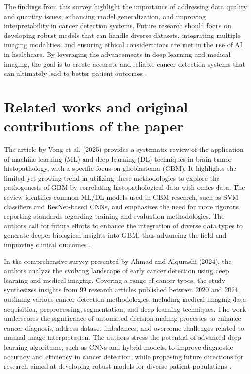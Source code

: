 \documentclass[runningheads]{llncs}
\begin{document}
The findings from this survey highlight the importance of addressing data quality and quantity issues, enhancing model generalization, and improving interpretability in cancer detection systems. Future research should focus on developing robust models that can handle diverse datasets, integrating multiple imaging modalities, and ensuring ethical considerations are met in the use of AI in healthcare. By leveraging the advancements in deep learning and medical imaging, the goal is to create accurate and reliable cancer detection systems that can ultimately lead to better patient outcomes \cite{Istiak_2024}.
\section{Related works and original contributions of the paper}
The article by Vong et al. (2025) provides a systematic review of the application of machine learning (ML) and deep learning (DL) techniques in brain tumor histopathology, with a specific focus on glioblastoma (GBM). It highlights the limited yet growing trend in utilizing these methodologies to explore the pathogenesis of GBM by correlating histopathological data with omics data. The review identifies common ML/DL models used in GBM research, such as SVM classifiers and ResNet-based CNNs, and emphasizes the need for more rigorous reporting standards regarding training and evaluation methodologies. The authors call for future efforts to enhance the integration of diverse data types to generate deeper biological insights into GBM, thus advancing the field and improving clinical outcomes \cite{Chun_2025}.

In the comprehensive survey presented by Ahmad and Alqurashi (2024), the authors analyze the evolving landscape of early cancer detection using deep learning and medical imaging. Covering a range of cancer types, the study synthesizes insights from 99 research articles published between 2020 and 2024, outlining various cancer detection methodologies, including medical imaging data acquisition, preprocessing, segmentation, and deep learning techniques. The work underscores the significance of automated decision-making processes to enhance cancer diagnosis, address dataset imbalances, and overcome challenges related to manual image interpretation. The authors stress the potential of advanced deep learning algorithms, such as CNNs and hybrid models, to improve diagnostic accuracy and efficiency in cancer detection, while proposing future directions for research aimed at developing robust models for diverse patient populations \cite{Istiak_2024}.
\end{document}
